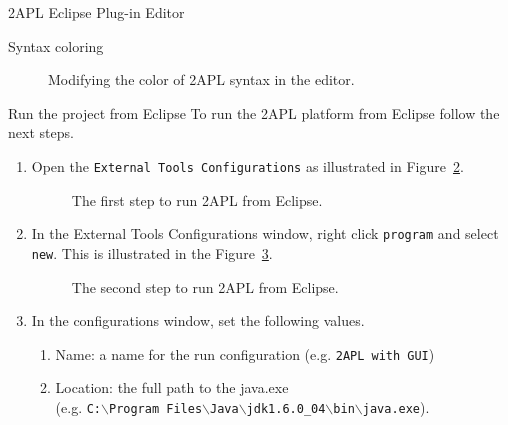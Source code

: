 \begin{chapter}{2APL Eclipse Plug-in Editor}
\begin{section}{Syntax coloring}
        \begin{figure}[ht]
            \begin{center}
            \end{center}\label{fig:color1}
            \caption{Modifying the color of 2APL syntax in the editor.}\label{fig:coloring}
        \end{figure}

\end{section}


\begin{section}{Run the project from Eclipse}
    To run the 2APL platform from Eclipse follow the next steps.
    \begin{enumerate}
    \item Open the \texttt{External Tools Configurations} as
    illustrated in Figure~\ref{fig:runconfiguration}.
        \begin{figure}[ht]
            \begin{center}
            \end{center}
            \caption{The first step to run 2APL from Eclipse.}\label{fig:runconfiguration}
        \end{figure}

    \item In the External Tools Configurations window, right click \texttt{program} and select
    \texttt{new}. This is illustrated in the Figure~\ref{fig:runconfiguration1}.
        \begin{figure}[ht]
            \begin{center}
            \end{center}
            \caption{The second step to run 2APL from Eclipse.}\label{fig:runconfiguration1}
        \end{figure}

    \item In the configurations window, set the following values.
        \begin{enumerate}
        \item Name: a name for the run configuration (e.g. \texttt{2APL with GUI})

        \item Location: the full path to the java.exe\\
        (e.g. \texttt{C:$\backslash$Program
        Files$\backslash$Java$\backslash$jdk1.6.0\_04$\backslash$bin$\backslash$java.exe}).


\end{enumerate}
\end{enumerate}
\end{section}
\end{chapter}
